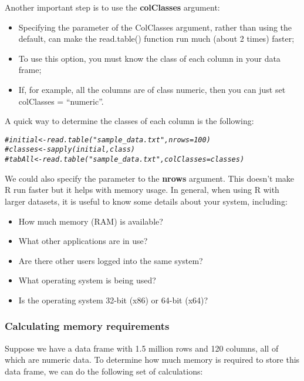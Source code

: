 \documentclass[10pt,a4paper,twoside]{article}\usepackage[]{graphicx}\usepackage[]{xcolor}
\makeatletter
\newcommand{\hlcom}[1]{\textcolor[rgb]{0.678,0.584,0.686}{\textit{#1}}}%
\newenvironment{kframe}{%
 \def\at@end@of@kframe{}%
 \ifinner\ifhmode%
  \def\at@end@of@kframe{\end{minipage}}%
  \begin{minipage}{\columnwidth}%
 \fi\fi%
 \def\FrameCommand##1{\hskip\@totalleftmargin \hskip-\fboxsep
 \colorbox{shadecolor}{##1}\hskip-\fboxsep
     \hskip-\linewidth \hskip-\@totalleftmargin \hskip\columnwidth}%
 \MakeFramed {\advance\hsize-\width
   \@totalleftmargin\z@ \linewidth\hsize
   \@setminipage}}%
 {\par\unskip\endMakeFramed%
 \at@end@of@kframe}
\newenvironment{knitrout}{}{} %
\makeatother
\begin{document}
Another important step is to use the \textbf{colClasses} argument:

\begin{itemize}
  \item Specifying the parameter of the ColClasses argument, rather than using the default, can make the read.table() function run much (about 2 times) faster;
  \item To use this option, you must know the class of each column in your data frame;
  \item If, for example, all the columns are of class numeric, then you can just set colClasses = ``numeric''.
\end{itemize}

A quick way to determine the classes of each column is the following:

\begin{knitrout}
\color{fgcolor}\begin{kframe}
\begin{alltt}
\hlcom{# initial <- read.table("sample_data.txt", nrows = 100)}
\hlcom{# classes <- sapply(initial, class)}
\hlcom{# tabAll <- read.table("sample_data.txt", colClasses = classes)}
\end{alltt}
\end{kframe}
\end{knitrout}

We could also specify the parameter to the \textbf{nrows} argument. This doesn't make R run faster but it helps with memory usage. In general, when using R with larger datasets, it is useful to know some details about your system, including:

\begin{itemize}
  \item How much memory (RAM) is available?
  \item What other applications are in use?
  \item Are there other users logged into the same system?
  \item What operating system is being used?
  \item Is the operating system 32-bit (x86) or 64-bit (x64)?
\end{itemize}

\subsubsection{Calculating memory requirements}

Suppose we have a data frame with 1.5 million rows and 120 columns, all of which are numeric data. To determine how much memory is required to store this data frame, we can do the following set of calculations:
\end{document}
